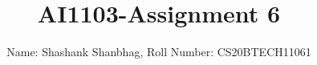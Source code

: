 \documentclass[journal,12pt,twocolumn]{IEEEtran}
\DeclareMathOperator*{\Res}{Res}
\begin{document}
\newcommand{\BEQA}{\begin{eqnarray}}
\newcommand{\EEQA}{\end{eqnarray}}
\newcommand{\define}{\stackrel{\triangle}{=}}

\raggedbottom
\setlength{\parindent}{0pt}
\providecommand{\mbf}{\mathbf}
\providecommand{\pr}[1]{\ensuremath{\Pr\left(#1\right)}}
\providecommand{\qfunc}[1]{\ensuremath{Q\left(#1\right)}}
\providecommand{\sbrak}[1]{\ensuremath{{}\left[#1\right]}}
\providecommand{\lsbrak}[1]{\ensuremath{{}\left[#1\right.}}
\providecommand{\rsbrak}[1]{\ensuremath{{}\left.#1\right]}}
\providecommand{\brak}[1]{\ensuremath{\left(#1\right)}}
\providecommand{\lbrak}[1]{\ensuremath{\left(#1\right.}}
\providecommand{\rbrak}[1]{\ensuremath{\left.#1\right)}}
\providecommand{\cbrak}[1]{\ensuremath{\left\{#1\right\}}}
\providecommand{\lcbrak}[1]{\ensuremath{\left\{#1\right.}}
\providecommand{\rcbrak}[1]{\ensuremath{\left.#1\right\}}}
\theoremstyle{remark}
\newtheorem{rem}{Remark}
\newcommand{\sgn}{\mathop{\mathrm{sgn}}}
\providecommand{\abs}[1]{\vert#1\vert}
\providecommand{\res}[1]{\Res\displaylimits_{#1}} 
\providecommand{\norm}[1]{\lVert#1\rVert}
\providecommand{\mtx}[1]{\mathbf{#1}}
\providecommand{\mean}[1]{E[ #1 ]}
\providecommand{\fourier}{\overset{\mathcal{F}}{ \rightleftharpoons}}
\providecommand{\system}{\overset{\mathcal{H}}{ \longleftrightarrow}}
\newcommand{\solution}{\noindent \textbf{Solution: }}
\newcommand{\cosec}{\,\text{cosec}\,}
\providecommand{\dec}[2]{\ensuremath{\overset{#1}{\underset{#2}{\gtrless}}}}
\newcommand{\myvec}[1]{\ensuremath{\begin{pmatrix}#1\end{pmatrix}}}
\newcommand{\mydet}[1]{\ensuremath{\begin{vmatrix}#1\end{vmatrix}}}
\makeatletter
{}
\makeatother
\let\StandardTheFigure\thefigure
\let\vec\mathbf
\renewcommand{\thefigure}{\theproblem}
\def\putbox#1#2#3{\makebox[0in][l]{\makebox[#1][l]{}\raisebox{\baselineskip}[0in][0in]{\raisebox{#2}[0in][0in]{#3}}}}
     \def\rightbox#1{\makebox[0in][r]{#1}}
     \def\centbox#1{\makebox[0in]{#1}}
     \def\topbox#1{\raisebox{-\baselineskip}[0in][0in]{#1}}
     \def\midbox#1{\raisebox{-0.5\baselineskip}[0in][0in]{#1}}
\vspace{3cm}
\title{\textbf{AI1103-Assignment 6}}
\author{Name: Shashank Shanbhag, Roll Number: CS20BTECH11061 }
\maketitle
\newpage
\bigskip
\renewcommand{\thefigure}{\theenumi}
\renewcommand{\thetable}{\theenumi}
\end{document}
